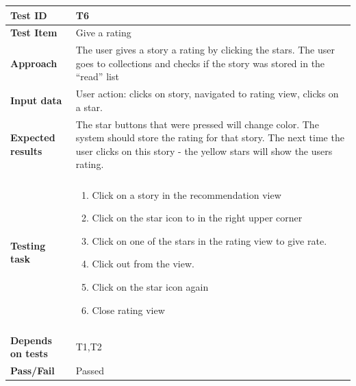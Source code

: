 \begin{appendices}
\begin{table}[H]
	\label{Tab:systemTesting5}
	\end{table}
	


	\begin{table}[H]
		\centering
		\begin{tabular}{ | l | l  |}
			\hline
			\textbf{Test ID} & T6  \\ \hline
			\textbf{Test Item} & Give a rating \\ \hline
			\textbf{Approach} & \begin{minipage}{5in}The user gives a story a rating by clicking the stars. The user goes to collections and checks if the story was stored in the “read” list \end{minipage}\\ \hline
			\textbf{Input data} &  \begin{minipage}{5in}User action: clicks on story, navigated to rating view, clicks on a star. \end{minipage}\\ \hline
			\textbf{Expected results} & \begin{minipage}{5in}The star buttons that were pressed will change color.  The system should store the rating for that story. The next time the user clicks on this story - the yellow stars will show the users rating.  \end{minipage}\\ \hline&\\[-3.8ex]
			\textbf{Testing task} & \begin{minipage}{5in}
			\begin{enumerate}[noitemsep]
			\item Click on a story in the recommendation view
			\item Click on the star icon to in the right upper corner
			\item Click on one of the stars in the rating view to give rate.
			\item Click out from the view. 
			\item Click on the star icon again
			\item Close rating view
			\end{enumerate}\end{minipage}
			\\ &\\[-3.8ex]\hline
			\textbf{Depends on tests} & T1,T2 \\ \hline		
			\textbf{Pass/Fail} & Passed \\\hline			
		\end{tabular}


\end{table}
\end{appendices}

